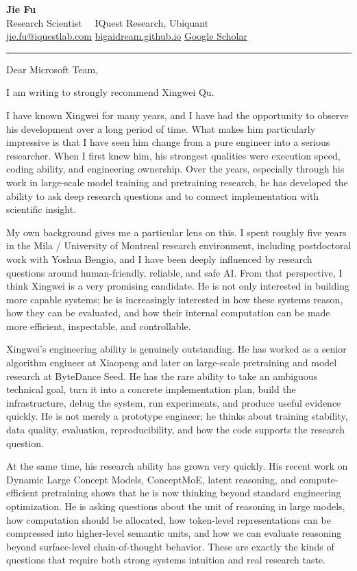 \documentclass[11pt,a4paper]{letter}
\makeatletter
\newcommand{\senderName}{Jie Fu}
\newcommand{\senderTitle}{Research Scientist}
\newcommand{\senderAffiliation}{IQuest Research, Ubiquant}
\newcommand{\senderEmail}{\href{mailto:jie.fu@iquestlab.com}{jie.fu@iquestlab.com}}
\newcommand{\senderWebsite}{\href{https://bigaidream.github.io}{bigaidream.github.io}}
\newcommand{\senderScholar}{\href{https://scholar.google.com/citations?user=66osleIAAAAJ}{Google Scholar}}
\renewcommand{\opening}[1]{%
  \begin{flushleft}
    {\fontsize{22}{26}\selectfont\bfseries\color{accent}\senderName}\\[4pt]
    {\sffamily\small\color{accent}\senderTitle\ \,\textbullet\,\ \senderAffiliation}\\[6pt]
    {\sffamily\footnotesize\color{subtle}%
       \senderEmail \quad\textcolor{accentSoft}{\textbar}\quad
       \senderWebsite \quad\textcolor{accentSoft}{\textbar}\quad
       \senderScholar}
  \end{flushleft}
  \vspace{4pt}
  {\color{rule}\rule{\linewidth}{0.6pt}}
  \vspace{18pt}

  \begin{flushleft}
    {\sffamily\small\color{subtle}\@date}
  \end{flushleft}
  \vspace{4pt}

  \noindent #1\par\nobreak
  \vspace{8pt}
}
\makeatother
\begin{document}
\setlength{\parindent}{0pt}
\setlength{\parskip}{8pt}

\begin{letter}{}

\date{May 24, 2026}

\opening{Dear Microsoft Team,}

\justifying

I am writing to strongly recommend Xingwei Qu.

I have known Xingwei for many years, and I have had the opportunity to observe
his development over a long period of time. What makes him particularly
impressive is that I have seen him change from a pure engineer into a serious
researcher. When I first knew him, his strongest qualities were execution
speed, coding ability, and engineering ownership. Over the years, especially
through his work in large-scale model training and pretraining research, he
has developed the ability to ask deep research questions and to connect
implementation with scientific insight.

My own background gives me a particular lens on this. I spent roughly five
years in the Mila / University of Montreal research environment, including
postdoctoral work with Yoshua Bengio, and I have been deeply influenced by
research questions around human-friendly, reliable, and safe AI. From that
perspective, I think Xingwei is a very promising candidate. He is not only
interested in building more capable systems; he is increasingly interested in
how these systems reason, how they can be evaluated, and how their internal
computation can be made more efficient, inspectable, and controllable.

Xingwei's engineering ability is genuinely outstanding. He has worked as a
senior algorithm engineer at Xiaopeng and later on large-scale pretraining
and model research at ByteDance Seed. He has the rare ability to take an
ambiguous technical goal, turn it into a concrete implementation plan, build
the infrastructure, debug the system, run experiments, and produce useful
evidence quickly. He is not merely a prototype engineer; he thinks about
training stability, data quality, evaluation, reproducibility, and how the
code supports the research question.

At the same time, his research ability has grown very quickly. His recent
work on Dynamic Large Concept Models, ConceptMoE, latent reasoning, and
compute-efficient pretraining shows that he is now thinking beyond standard
engineering optimization. He is asking questions about the unit of reasoning
in large models, how computation should be allocated, how token-level
representations can be compressed into higher-level semantic units, and how
we can evaluate reasoning beyond surface-level chain-of-thought behavior.
These are exactly the kinds of questions that require both strong systems
intuition and real research taste.


\end{letter}
\end{document}
